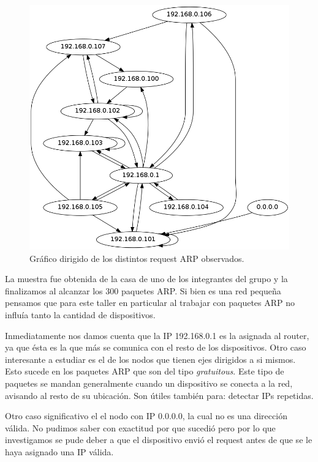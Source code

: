 \documentclass[a4paper]{article}
\begin{document}
\begin{figure}[H]
  \centering
  \includegraphics[scale=0.30]{graficos/arpGraph.png}
  \caption{Gráfico dirigido de los distintos request ARP observados.}
\end{figure}

 
La muestra fue obtenida de la casa de uno de los integrantes del grupo y la finalizamos al alcanzar los 300 paquetes ARP.  
Si bien es una red pequeña pensamos que para este taller en particular al trabajar con paquetes ARP no influía tanto la cantidad de dispositivos.

Inmediatamente nos damos cuenta que la IP 192.168.0.1 es la asignada al router, ya que ésta es la que más se comunica con el resto de los dispositivos. 
Otro caso interesante a estudiar es el de los nodos que tienen ejes dirigidos a si mismos. Esto sucede en los paquetes ARP que son del tipo \textit{gratuitous}. Este tipo de paquetes se mandan generalmente cuando un dispositivo se conecta a la red, avisando al resto de su ubicación. Son útiles también para: detectar IPs repetidas.

Otro caso significativo el el nodo con IP 0.0.0.0, la cual no es una dirección válida. No pudimos saber con exactitud por que sucedió pero por lo que investigamos se pude deber a que el dispositivo envió el request antes de que se le haya asignado una IP válida. 


 
\end{document}
